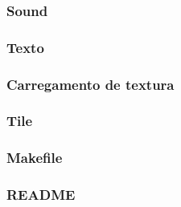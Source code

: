 \subsubsection{Sound}

\subsubsection{Texto}

\subsubsection{Carregamento de textura}

\subsubsection{Tile}




\subsubsection{Makefile}

\subsubsection{README}\label{README}


%








